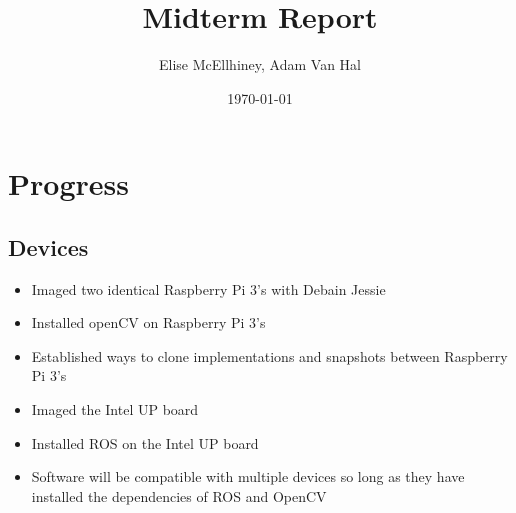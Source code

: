\documentclass[11pt]{amsart}
\title{Midterm Report}
\author{Elise McEllhiney, Adam Van Hal}
\date{\today}                                           %
\begin{document}
\maketitle

\section{Progress}
\subsection{Devices}
\begin{itemize}
\item Imaged two identical Raspberry Pi 3's with Debain Jessie
\item Installed openCV on Raspberry Pi 3's
\item Established ways to clone implementations and snapshots between Raspberry Pi 3's
\item Imaged the Intel UP board
\item Installed ROS on the Intel UP board
\item Software will be compatible with multiple devices so long as they have installed the dependencies of ROS and OpenCV
\end{itemize}
\end{document}
